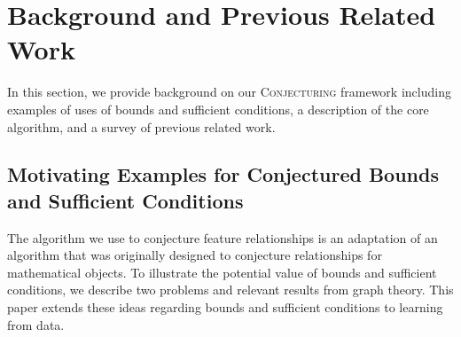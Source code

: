 \documentclass[ijds,nonblindrev]{informs-ijds}
\begin{document}
%
%
\section{Background and Previous Related Work}
\label{relatedwork}

In this section, we provide background on our  \textsc{Conjecturing} framework including examples of uses of bounds and sufficient conditions, a description of the core algorithm, and a survey of previous related work.

\subsection{Motivating Examples for Conjectured Bounds and Sufficient Conditions}
The algorithm we use to conjecture feature relationships is an adaptation of an algorithm that was originally designed to conjecture relationships for mathematical objects.  To illustrate the potential value of bounds and sufficient conditions, we describe two problems and relevant results from graph theory.  This paper extends these ideas regarding bounds and sufficient conditions to learning from data.
\end{document}
